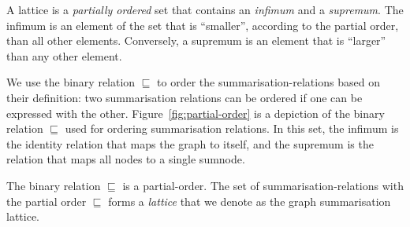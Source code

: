 A \gls{lattice} is a \emph{partially ordered} set that contains an \emph{infimum} and a \emph{supremum}. The infimum is an element of the set that is ``smaller'', according to the partial order, than all other elements. Conversely, a supremum is an element that is ``larger'' than any other element.

We use the binary relation $\sqsubseteq$ to order the \glspl{summarisation-relation} based on their definition: two summarisation relations can be ordered if one can be expressed with the other. Figure~\ref{fig:partial-order} is a depiction of the binary relation $\sqsubseteq$ used for ordering summarisation relations. In this set, the infimum is the identity relation that maps the graph to itself, and the supremum is the relation that maps all nodes to a single sumnode.

\begin{theorem}
	The binary relation $\sqsubseteq$ is a \gls{partial-order}. The set of \glspl{summarisation-relation} with the partial order $\sqsubseteq$ forms a \emph{lattice} that we denote as the graph summarisation lattice.
\end{theorem}

